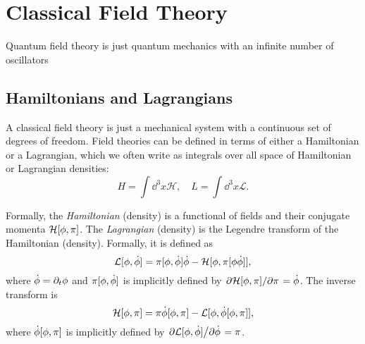 \section{Classical Field Theory}
Quantum field theory is just quantum mechanics with an infinite number of oscillators

\subsection{Hamiltonians and Lagrangians}
A classical field theory is just a mechanical system with a continuous set of degrees of freedom. Field theories can be defined in terms of either a Hamiltonian or a Lagrangian, which we often write as integrals over all space of Hamiltonian or Lagrangian densities:
\begin{equation}
	H=\int\dd^3x\mathcal{H},\quad L=\int\dd^3x\mathcal{L}.
\end{equation}

Formally, the \textit{Hamiltonian} (density) is a functional of fields and their conjugate momenta $\mathcal{H}[\phi,\pi ]$. The \textit{Lagrangian} (density) is the Legendre transform of the Hamiltonian (density). Formally, it is defined as
\begin{equation}
  \mathcal{L}[\phi,\dot{\phi }]=\pi [\phi,\dot{\phi }]\dot{\phi }-\mathcal{H}[\phi,\pi[\phi\dot{\phi }]],
\end{equation}
where $\dot{\phi }=\partial_t\phi $ and $\pi [\phi,\dot{\phi }]$ is implicitly defined by $\pdv*{\mathcal{H}[\phi,\pi ]}{\pi }=\dot{\phi }$. The inverse transform is
\begin{equation}
  \mathcal{H}[\phi,\pi ]=\pi \dot{\phi }[\phi,\pi ]-\mathcal{L}[\phi,\dot{\phi }[\phi,\pi ]],
\end{equation}
where $\dot{\phi }[\phi,\pi ]$ is implicitly defined by $\pdv*{\mathcal{L}[\phi,\dot{\phi }]}{\dot{\phi }}=\pi $.

